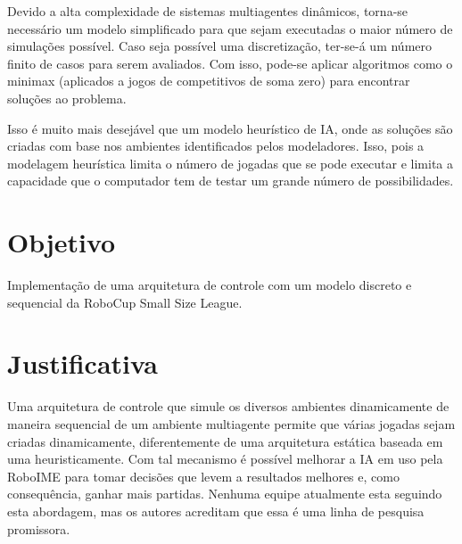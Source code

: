 Devido a alta complexidade de sistemas multiagentes dinâmicos, torna-se necessário
um modelo simplificado para que sejam executadas o maior número de simulações possível.
Caso seja possível uma discretização, ter-se-á um número finito de casos para serem
avaliados. Com isso, pode-se aplicar algoritmos como o minimax (aplicados a jogos de
competitivos de soma zero) para encontrar soluções ao problema.

Isso é muito mais desejável que um modelo heurístico de IA, onde as soluções são
criadas com base nos ambientes identificados pelos modeladores. Isso, pois
a modelagem heurística limita o número de jogadas que se pode executar e limita
a capacidade que o computador tem de testar um grande número de possibilidades.

\section{Objetivo}
Implementação de uma arquitetura de controle com um modelo discreto e sequencial da
RoboCup Small Size League.

\section{Justificativa}
Uma arquitetura de controle que simule os diversos ambientes dinamicamente de maneira sequencial
de um ambiente multiagente permite que várias jogadas sejam criadas dinamicamente, diferentemente
de uma arquitetura estática baseada em uma heuristicamente. Com tal mecanismo é possível melhorar
a IA em uso pela RoboIME para tomar decisões que levem a resultados melhores e, como consequência,
ganhar mais partidas. Nenhuma equipe atualmente esta seguindo esta abordagem, mas
os autores acreditam que essa é uma linha de pesquisa promissora.
